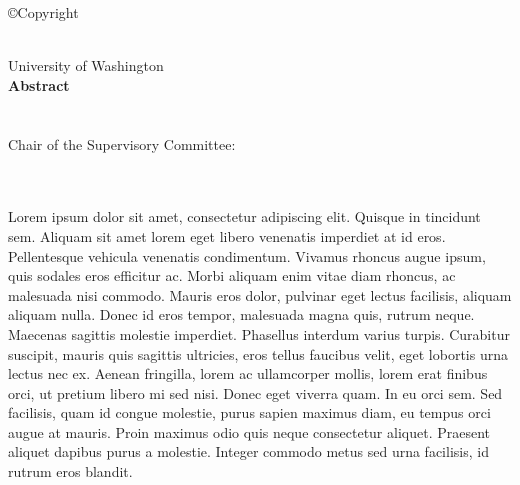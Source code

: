 
\thispagestyle{empty}
\begin{center}
    \copyright Copyright \graduationyear\\[.5cm]
\authorname\\[3cm]
\end{center}
\pagebreak


\thispagestyle{empty}
\begin{center}
University of Washington\\[.5cm]
\textbf{Abstract}\\[.5cm]
\thesistitle\\[1cm]
\authorname\\[1cm]
Chair of the Supervisory Committee:\\
\chairname\\
\chairdepartment\\[1cm]
\end{center}

\begin{raggedright}
    Lorem ipsum dolor sit amet, consectetur adipiscing elit. Quisque in tincidunt sem. Aliquam sit amet lorem eget libero venenatis imperdiet at id eros. Pellentesque vehicula venenatis condimentum. Vivamus rhoncus augue ipsum, quis sodales eros efficitur ac. Morbi aliquam enim vitae diam rhoncus, ac malesuada nisi commodo. Mauris eros dolor, pulvinar eget lectus facilisis, aliquam aliquam nulla. Donec id eros tempor, malesuada magna quis, rutrum neque. Maecenas sagittis molestie imperdiet. Phasellus interdum varius turpis. Curabitur suscipit, mauris quis sagittis ultricies, eros tellus faucibus velit, eget lobortis urna lectus nec ex. Aenean fringilla, lorem ac ullamcorper mollis, lorem erat finibus orci, ut pretium libero mi sed nisi. Donec eget viverra quam. In eu orci sem. Sed facilisis, quam id congue molestie, purus sapien maximus diam, eu tempus orci augue at mauris. Proin maximus odio quis neque consectetur aliquet. Praesent aliquet dapibus purus a molestie. Integer commodo metus sed urna facilisis, id rutrum eros blandit. 
\end{raggedright}
